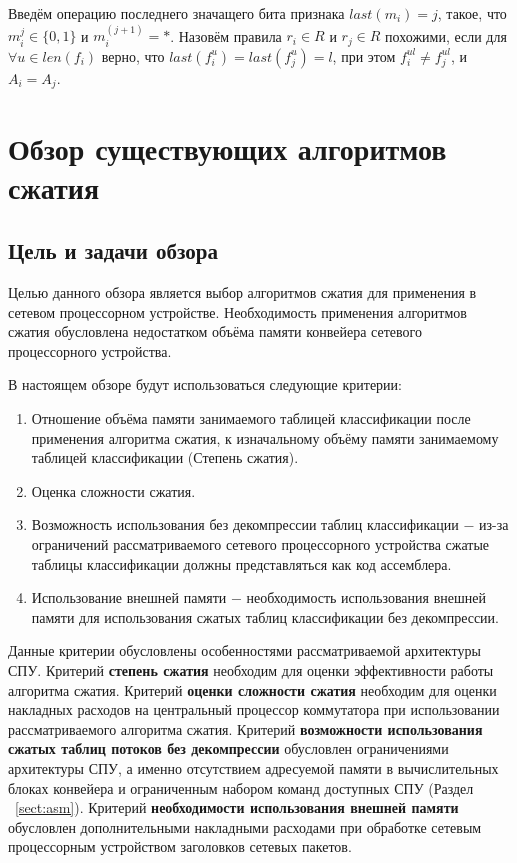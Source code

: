 \documentclass[oneside,final,12pt]{extarticle}
\begin{document}
        Введём операцию последнего значащего бита признака \(last(m_i) = j\), такое, что \(m_i^j \in \{0, 1\}\) и \(m_i^{(j+1)} = *\). 
        Назовём правила \(r_i \in R\) и \(r_j \in R\) похожими, 
        если для \(\forall u \in len(f_i)\) верно, что \(last(f_i^u) = last(f_j^u) = l\), при этом \(f_i^{ul} \neq f_j^{ul}\), и \(A_i = A_j\).



    \section{Обзор существующих алгоритмов сжатия}
        \subsection{Цель и задачи обзора}
        Целью данного обзора является выбор алгоритмов сжатия для применения в сетевом процессорном устройстве. 
        Необходимость применения алгоритмов сжатия обусловлена недостатком объёма памяти конвейера сетевого процессорного устройства.
        
        В настоящем обзоре будут использоваться следующие критерии:
        \begin{enumerate}
            \item Отношение объёма памяти занимаемого таблицей классификации после применения алгоритма сжатия, 
                к изначальному объёму памяти занимаемому таблицей классификации (Степень сжатия).
            \item Оценка сложности сжатия.
            \item Возможность использования без декомпрессии таблиц классификации $-$ 
                из-за ограничений рассматриваемого сетевого процессорного устройства сжатые таблицы классификации 
                должны представляться как код ассемблера.
            \item Использование внешней памяти $-$ необходимость использования внешней памяти 
                для использования сжатых таблиц классификации без декомпрессии.
        \end{enumerate}

        Данные критерии обусловлены особенностями рассматриваемой архитектуры СПУ. 
        Критерий \textbf{степень сжатия} необходим для оценки эффективности работы алгоритма сжатия.
        Критерий \textbf{оценки сложности сжатия} необходим для оценки накладных расходов на центральный процессор коммутатора при использовании рассматриваемого
        алгоритма сжатия.
        Критерий \textbf{возможности использования сжатых таблиц потоков без декомпрессии} обусловлен ограничениями архитектуры СПУ, а именно
        отсутствием адресуемой памяти в вычислительных блоках конвейера и ограниченным набором команд доступных СПУ (Раздел ~\ref{sect:asm}).
        Критерий \textbf{необходимости использования внешней памяти} обусловлен дополнительными накладными расходами при обработке сетевым процессорным устройством 
        заголовков сетевых пакетов.
\end{document}
